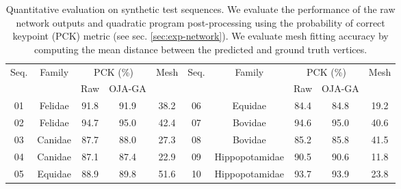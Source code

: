   \begin{table}[ht]
  \centering
  \small
  \begin{tabular}{@{}cccccccccc@{}}
  
  \toprule
         \multirow{2}{*}{Seq.}  & \multirow{2}{*}{Family} & \multicolumn{2}{c}{PCK (\%)} &   \multirow{2}{*}{Mesh}  & \multirow{2}{*}{Seq.} & \multirow{2}{*}{Family} & \multicolumn{2}{c}{PCK (\%)} &   \multirow{2}{*}{Mesh} \\
  &  & Raw                  & OJA-GA &  &&& Raw                  & OJA-GA           \\ \midrule
  01 & Felidae         & 91.8     & 91.9  & 38.2   &  06 & Equidae         & 84.4     & 84.8  & 19.2     \\
  02 & Felidae         & 94.7     & 95.0  & 42.4   &  07 & Bovidae         & 94.6     & 95.0  & 40.6     \\
  03 & Canidae         & 87.7     & 88.0  & 27.3   &  08 & Bovidae        & 85.2     & 85.8  & 41.5     \\  
  04 & Canidae         & 87.1     & 87.4  & 22.9   &  09 & Hippopotamidae  & 90.5     & 90.6  & 11.8     \\
  05 & Equidae         & 88.9     & 89.8  & 51.6   &  10 & Hippopotamidae  & 93.7     & 93.9  & 23.8     \\    
  \bottomrule
  \end{tabular}%
  
  \caption{Quantitative evaluation on synthetic test sequences. We evaluate the performance of the raw network outputs and quadratic program post-processing using the probability of correct keypoint (PCK) metric (see sec. \ref{sec:exp-network}). We evaluate mesh fitting accuracy by computing the mean distance between the predicted and ground truth vertices.}
  \label{tab:synthetic}
  \end{table}
  

